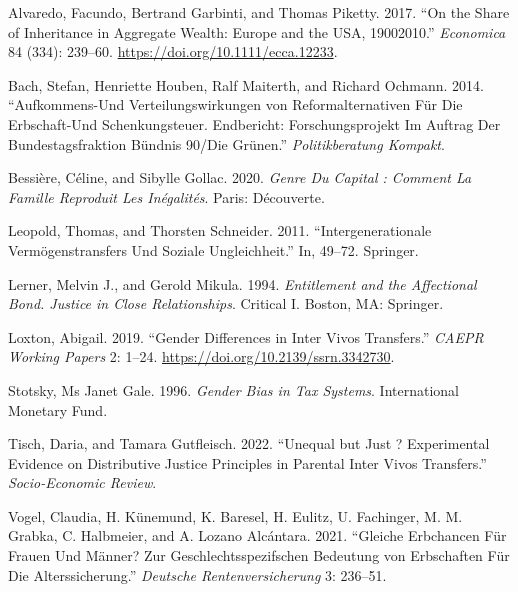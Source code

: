 \documentclass[
  letterpaper,
  DIV=11,
  numbers=noendperiod]{scrartcl}
\newlength{\cslhangindent}
\newlength{\cslentryspacingunit} %
\newenvironment{CSLReferences}[2] %
 {%
  \setlength{\parindent}{0pt}
  \ifodd #1
  \let\oldpar\par
  \def\par{\hangindent=\cslhangindent\oldpar}
  \fi
  \setlength{\parskip}{#2\cslentryspacingunit}
 }%
 {}
\begin{document}
\hypertarget{refs}{}
\begin{CSLReferences}{1}{0}
\leavevmode{}%
Alvaredo, Facundo, Bertrand Garbinti, and Thomas Piketty. 2017. {``On
the Share of Inheritance in Aggregate Wealth: Europe and the USA,
1900{\textendash}2010.''} \emph{Economica} 84 (334): 239--60.
\url{https://doi.org/10.1111/ecca.12233}.

\leavevmode{}%
Bach, Stefan, Henriette Houben, Ralf Maiterth, and Richard Ochmann.
2014. {``Aufkommens-Und Verteilungswirkungen von Reformalternativen Für
Die Erbschaft-Und Schenkungsteuer. Endbericht: Forschungsprojekt Im
Auftrag Der Bundestagsfraktion Bündnis 90/Die Grünen.''}
\emph{Politikberatung Kompakt}.

\leavevmode{}%
Bessière, Céline, and Sibylle Gollac. 2020. \emph{Genre Du Capital :
Comment La Famille Reproduit Les Inégalités}. Paris: Découverte.

\leavevmode{}%
Leopold, Thomas, and Thorsten Schneider. 2011. {``Intergenerationale
Vermögenstransfers Und Soziale Ungleichheit.''} In, 49--72. Springer.

\leavevmode{}%
Lerner, Melvin J., and Gerold Mikula. 1994. \emph{Entitlement and the
Affectional Bond. Justice in Close Relationships}. Critical I. Boston,
MA: Springer.

\leavevmode{}%
Loxton, Abigail. 2019. {``Gender Differences in Inter Vivos
Transfers.''} \emph{CAEPR Working Papers} 2: 1--24.
\url{https://doi.org/10.2139/ssrn.3342730}.

\leavevmode{}%
Stotsky, Ms Janet Gale. 1996. \emph{Gender Bias in Tax Systems}.
International Monetary Fund.

\leavevmode{}%
Tisch, Daria, and Tamara Gutfleisch. 2022. {``Unequal but Just ?
Experimental Evidence on Distributive Justice Principles in Parental
Inter Vivos Transfers.''} \emph{Socio-Economic Review}.

\leavevmode{}%
Vogel, Claudia, H. Künemund, K. Baresel, H. Eulitz, U. Fachinger, M. M.
Grabka, C. Halbmeier, and A. Lozano Alcántara. 2021. {``Gleiche
Erbchancen Für Frauen Und Männer? Zur Geschlechtsspezifschen Bedeutung
von Erbschaften Für Die Alterssicherung.''} \emph{Deutsche
Rentenversicherung} 3: 236--51.

\end{CSLReferences}
\end{document}
